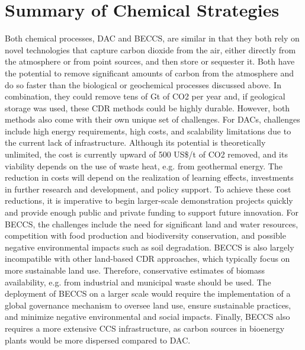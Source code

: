 \section{Summary of Chemical Strategies}
Both chemical processes, DAC and BECCS, are similar in that they both rely on novel technologies that capture carbon dioxide from the air, either directly from the atmosphere or from point sources, and then store or sequester it. Both have the potential to remove significant amounts of carbon from the atmosphere and do so faster than the biological or geochemical processes discussed above. In combination, they could remove tens of Gt of CO2 per year and, if geological storage was used, these CDR methods could be highly durable.
However, both methods also come with their own unique set of challenges. For DACs, challenges include high energy requirements, high costs, and scalability limitations due to the current lack of infrastructure. Although its potential is theoretically unlimited, the cost is currently upward of 500 US\$/t of CO2 removed, and its viability depends on the use of waste heat, e.g. from geothermal energy. The reduction in costs will depend on the realization of learning effects, investments in further research and development, and policy support. To achieve these cost reductions, it is imperative to begin larger-scale demonstration projects quickly and provide enough public and private funding to support future innovation.
For BECCS, the challenges include the need for significant land and water resources, competition with food production and biodiversity conservation, and possible negative environmental impacts such as soil degradation. BECCS is also largely incompatible with other land-based CDR approaches, which typically focus on more sustainable land use. Therefore, conservative estimates of biomass availability, e.g. from industrial and municipal waste should be used. The deployment of BECCS on a larger scale would require the implementation of a global governance mechanism to oversee land use, ensure sustainable practices, and minimize negative environmental and social impacts. Finally, BECCS also requires a more extensive CCS infrastructure, as carbon sources in bioenergy plants would be more dispersed compared to DAC.